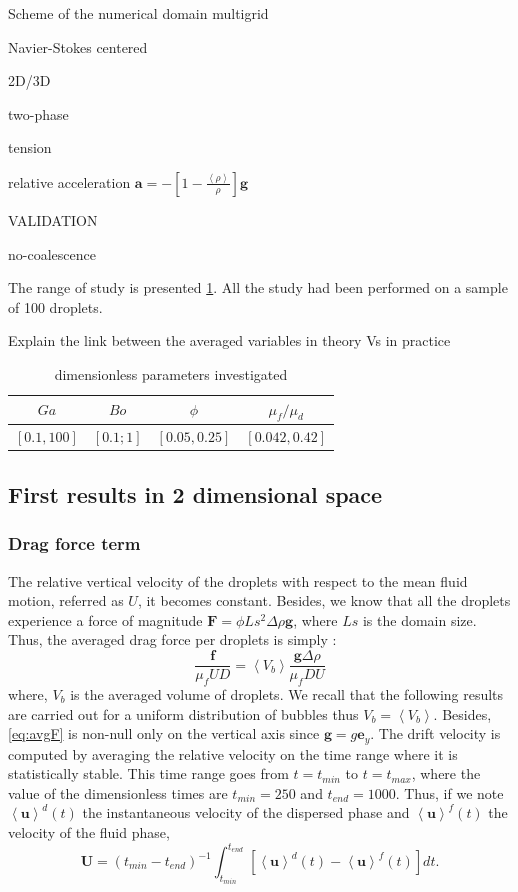 Scheme of the numerical domain
multigrid 

Navier-Stokes centered 

2D/3D

two-phase

tension

relative acceleration $\bm{a} = - \left[1-\frac{\left<\rho\right>}{\rho}\right]\bm{g}$

VALIDATION

no-coalescence

The range of study is presented \ref{tab:dim}. 
All the study had been performed on a sample of 100 droplets. 

Explain the link between the averaged variables in theory Vs in practice
\begin{table}[h!]
    \centering
    \begin{tabular}{||c|c|c|c||}
        \hline$Ga$&$Bo$&$\phi$&$\mu_f/\mu_d$\\ \hline
        $[0.1,100]$&$[0.1;1]$&$[0.05,0.25]$&$[0.042,0.42]$\\ \hline
    \end{tabular}
    \caption{dimensionless parameters investigated}
    \label{tab:dim}
\end{table}

 


\subsection{First results in 2 dimensional space}

\subsubsection{Drag force term}
The relative vertical velocity of the droplets with respect to the mean fluid motion, referred as $U$, it becomes constant.
Besides, we know that all the droplets experience a force of magnitude $\bm{F} = \phi Ls^2 \Delta \rho \bm{g}$, where $Ls$ is the domain size.
Thus, the averaged drag force per droplets is simply :
\begin{equation}
    \frac{\bm{f}}{\mu_f UD} = \left<V_b\right>\frac{\bm{g}\Delta \rho }{\mu_f D U}
    \label{eq:avgF}
\end{equation}  
where, $V_b$ is the averaged volume of droplets. 
We recall that the following results are carried out for a uniform distribution of bubbles thus $V_b = \left<V_b\right>$.
Besides, \ref{eq:avgF} is non-null only on the vertical axis since $\bm{g} = g \bm{e}_y$. 
The drift velocity is computed by averaging the relative velocity on the time range where it is statistically stable.
This time range goes from $t = t_{min}$ to $t = t_{max}$, where the value of the dimensionless times are $t_{min} = 250$ and $t_{end} = 1000$. 
Thus, if we note $\left<\bm{u}\right>^d(t)$ the instantaneous velocity of the dispersed phase and $\left<\bm{u}\right>^f(t)$ the velocity of the fluid phase,
\begin{equation}
    \bm{U} =\left(t_{min}-t_{end}\right)^{-1}\int_{t_{min}}^{t_{end}}\left[\left<\bm{u}\right>^d(t)-\left<\bm{u}\right>^f(t)\right] dt.
\end{equation}

